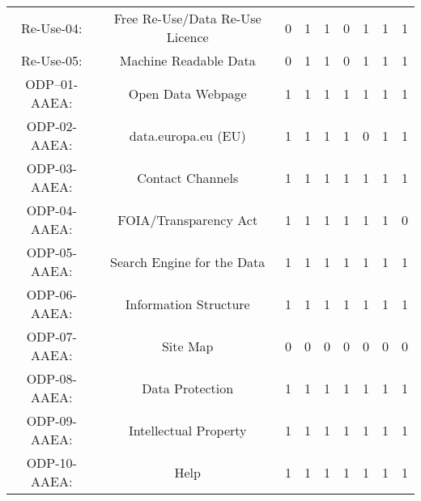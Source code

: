 \documentclass[a4paper, twoside]{report}
\begin{document}
\begin{table}[htbp]
\begin{adjustbox}{max width=\linewidth}
\begin{tabular}{rcccccccc}
    \multicolumn{1}{c}{Re-Use-04:} & \multicolumn{1}{p{19em}}{\cellcolor[rgb]{ .749,  .749,  .749}Free Re-Use/Data Re-Use Licence} & \cellcolor[rgb]{ .749,  .749,  .749}0 & \cellcolor[rgb]{ .749,  .749,  .749}1 & \cellcolor[rgb]{ .749,  .749,  .749}1 & \cellcolor[rgb]{ .749,  .749,  .749}0 & \cellcolor[rgb]{ .749,  .749,  .749}1 & \cellcolor[rgb]{ .749,  .749,  .749}1 & \cellcolor[rgb]{ .749,  .749,  .749}1 \\
    \multicolumn{1}{c}{Re-Use-05:} & \multicolumn{1}{p{19em}}{\cellcolor[rgb]{ .749,  .749,  .749}Machine Readable Data} & \cellcolor[rgb]{ .749,  .749,  .749}0 & \cellcolor[rgb]{ .749,  .749,  .749}1 & \cellcolor[rgb]{ .749,  .749,  .749}1 & \cellcolor[rgb]{ .749,  .749,  .749}0 & \cellcolor[rgb]{ .749,  .749,  .749}1 & \cellcolor[rgb]{ .749,  .749,  .749}1 & \cellcolor[rgb]{ .749,  .749,  .749}1 \\
    \midrule
    \multicolumn{1}{c}{ODP--01-AAEA:} & \multicolumn{1}{p{19em}}{Open Data Webpage} & 1     & 1     & 1     & 1     & 1     & 1     & 1 \\
    \multicolumn{1}{c}{ODP-02-AAEA:} & \multicolumn{1}{p{19em}}{data.europa.eu (EU)} & 1     & 1     & 1     & 1     & 0     & 1     & 1 \\
    \multicolumn{1}{c}{ODP-03-AAEA:} & \multicolumn{1}{p{19em}}{Contact Channels} & 1     & 1     & 1     & 1     & 1     & 1     & 1 \\
    \multicolumn{1}{c}{ODP-04-AAEA:} & \multicolumn{1}{p{19em}}{FOIA/Transparency Act} & 1     & 1     & 1     & 1     & 1     & 1     & 0 \\
    \multicolumn{1}{c}{ODP-05-AAEA:} & \multicolumn{1}{p{19em}}{Search Engine for the Data} & 1     & 1     & 1     & 1     & 1     & 1     & 1 \\
    \multicolumn{1}{c}{ODP-06-AAEA:} & \multicolumn{1}{p{19em}}{Information Structure} & 1     & 1     & 1     & 1     & 1     & 1     & 1 \\
    \multicolumn{1}{c}{ODP-07-AAEA:} & \multicolumn{1}{p{19em}}{Site Map} & 0     & 0     & 0     & 0     & 0     & 0     & 0 \\
    \multicolumn{1}{c}{ODP-08-AAEA:} & \multicolumn{1}{p{19em}}{Data Protection} & 1     & 1     & 1     & 1     & 1     & 1     & 1 \\
    \multicolumn{1}{c}{ODP-09-AAEA:} & \multicolumn{1}{p{19em}}{Intellectual Property} & 1     & 1     & 1     & 1     & 1     & 1     & 1 \\
    \multicolumn{1}{c}{ODP-10-AAEA:} & \multicolumn{1}{p{19em}}{Help} & 1     & 1     & 1     & 1     & 1     & 1     & 1 \\

\end{tabular}
\end{adjustbox}
\end{table}
\end{document}
